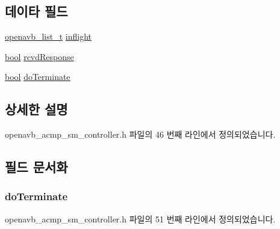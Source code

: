 \subsection*{데이타 필드}
\begin{DoxyCompactItemize}
\item 
\hyperlink{openavb__list_8h_a4bebe3a638fd3dc94da5912774a18cfe}{openavb\+\_\+list\+\_\+t} \hyperlink{structopenavb__acmp__sm__controller__vars__t_a8757a9f120141662b8b4c8b44c502c3c}{inflight}
\item 
\hyperlink{avb__gptp_8h_af6a258d8f3ee5206d682d799316314b1}{bool} \hyperlink{structopenavb__acmp__sm__controller__vars__t_aed3656b45b6db94eb58f5cec2d2c7323}{rcvd\+Response}
\item 
\hyperlink{avb__gptp_8h_af6a258d8f3ee5206d682d799316314b1}{bool} \hyperlink{structopenavb__acmp__sm__controller__vars__t_a5fc548cdb095393450f28eab966a626f}{do\+Terminate}
\end{DoxyCompactItemize}


\subsection{상세한 설명}


openavb\+\_\+acmp\+\_\+sm\+\_\+controller.\+h 파일의 46 번째 라인에서 정의되었습니다.



\subsection{필드 문서화}
\subsubsection[{\texorpdfstring{do\+Terminate}{doTerminate}}]{ do\+Terminate}\hypertarget{structopenavb__acmp__sm__controller__vars__t_a5fc548cdb095393450f28eab966a626f}{}\label{structopenavb__acmp__sm__controller__vars__t_a5fc548cdb095393450f28eab966a626f}


openavb\+\_\+acmp\+\_\+sm\+\_\+controller.\+h 파일의 51 번째 라인에서 정의되었습니다.

